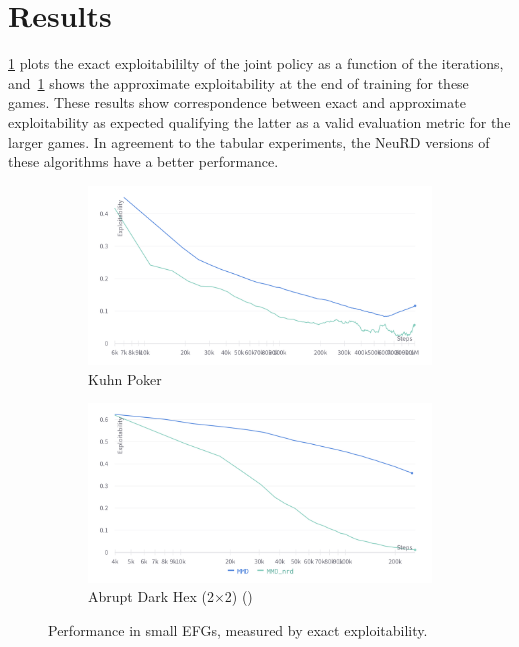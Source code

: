 \section{Results}
\ref{fig:neuralsmall1} plots the exact exploitabililty of the joint policy as a function of the
iterations, and~\ref{fig:neuralsmall1} shows the approximate exploitability at the end of training for these games.
These results show correspondence between exact and approximate exploitability as expected
qualifying the latter as a valid evaluation metric for the larger games.
In agreement to the tabular experiments, the NeuRD versions of these algorithms have a better
performance.

\begin{figure}[H]
	\centering
	\begin{subfigure}[b]{0.6\textwidth}
		\includegraphics[width=\textwidth]{figs/kpoker.png}
		\caption{Kuhn Poker}
	\end{subfigure}
	\begin{subfigure}[b]{0.6\textwidth}
		\includegraphics[width=\textwidth]{figs/ahex22.png}
		\caption{Abrupt Dark Hex (2$\times$2) ()}
	\end{subfigure}
	\caption{Performance in small EFGs, measured by exact exploitability.}
	\label{fig:neuralsmall1}
\end{figure}

